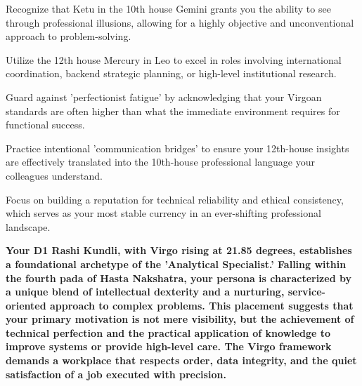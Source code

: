 \begin{diamondlist}
  \item {\fontsize{8.5}{12}\selectfont Recognize that Ketu in the 10th house Gemini grants you the ability to see through professional illusions, allowing for a highly objective and unconventional approach to problem-solving.}
  \item {\fontsize{8.5}{12}\selectfont Utilize the 12th house Mercury in Leo to excel in roles involving international coordination, backend strategic planning, or high-level institutional research.}
  \item {\fontsize{8.5}{12}\selectfont Guard against 'perfectionist fatigue' by acknowledging that your Virgoan standards are often higher than what the immediate environment requires for functional success.}
  \item {\fontsize{8.5}{12}\selectfont Practice intentional 'communication bridges' to ensure your 12th-house insights are effectively translated into the 10th-house professional language your colleagues understand.}
  \item {\fontsize{8.5}{12}\selectfont Focus on building a reputation for technical reliability and ethical consistency, which serves as your most stable currency in an ever-shifting professional landscape.}
\end{diamondlist}


\label{topic6}

{\fontsize{9.5}{13.8}\selectfont\bfseries\color{DeepSlate} Your D1 Rashi Kundli, with Virgo rising at 21.85 degrees, establishes a foundational archetype of the 'Analytical Specialist.' Falling within the fourth pada of Hasta Nakshatra, your persona is characterized by a unique blend of intellectual dexterity and a nurturing, service-oriented approach to complex problems. This placement suggests that your primary motivation is not mere visibility, but the achievement of technical perfection and the practical application of knowledge to improve systems or provide high-level care. The Virgo framework demands a workplace that respects order, data integrity, and the quiet satisfaction of a job executed with precision.}\par\vspace{2mm}

